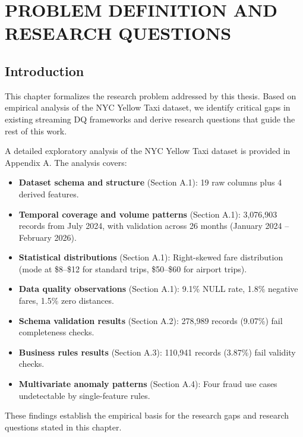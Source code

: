 \chapter{PROBLEM DEFINITION AND RESEARCH QUESTIONS}

\section{Introduction}

This chapter formalizes the research problem addressed by this thesis. Based on empirical analysis of the NYC Yellow Taxi dataset, we identify critical gaps in existing streaming DQ frameworks and derive research questions that guide the rest of this work.

A detailed exploratory analysis of the NYC Yellow Taxi dataset is provided in Appendix A. The analysis covers:
\begin{itemize}
    \item \textbf{Dataset schema and structure} (Section A.1): 19 raw columns plus 4 derived features.
    \item \textbf{Temporal coverage and volume patterns} (Section A.1): 3,076,903 records from July 2024, with validation across 26 months (January 2024 -- February 2026).
    \item \textbf{Statistical distributions} (Section A.1): Right-skewed fare distribution (mode at \$8--\$12 for standard trips, \$50--\$60 for airport trips).
    \item \textbf{Data quality observations} (Section A.1): 9.1\% NULL rate, 1.8\% negative fares, 1.5\% zero distances.
    \item \textbf{Schema validation results} (Section A.2): 278,989 records (9.07\%) fail completeness checks.
    \item \textbf{Business rules results} (Section A.3): 110,941 records (3.87\%) fail validity checks.
    \item \textbf{Multivariate anomaly patterns} (Section A.4): Four fraud use cases undetectable by single-feature rules.
\end{itemize}

These findings establish the empirical basis for the research gaps and research questions stated in this chapter.

